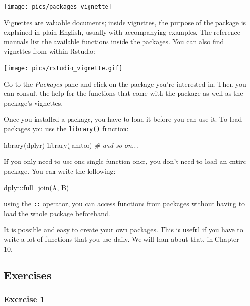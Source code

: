 \documentclass[
]{article}
\newenvironment{Shaded}{\begin{snugshade}}{\end{snugshade}}
\newcommand{\CommentTok}[1]{\textcolor[rgb]{0.56,0.35,0.01}{\textit{#1}}}
\newcommand{\FunctionTok}[1]{\textcolor[rgb]{0.00,0.00,0.00}{#1}}
\newcommand{\NormalTok}[1]{#1}
\newcommand{\SpecialCharTok}[1]{\textcolor[rgb]{0.00,0.00,0.00}{#1}}
\begin{document}
\texttt{[image: pics/packages\_vignette]}

Vignettes are valuable documents; inside vignettes, the purpose of the package is explained in
plain English, usually with accompanying examples. The reference manuals list the available functions
inside the packages. You can also find vignettes from within Rstudio:

\texttt{[image: pics/rstudio\_vignette.gif]}

Go to the \emph{Packages} pane and click on the package you're interested in. Then you can consult the
help for the functions that come with the package as well as the package's vignettes.

Once you installed a package, you have to load it before you can use it. To load packages you use the
\texttt{library()} function:

\begin{Shaded}
\begin{Highlighting}[]
\FunctionTok{library}\NormalTok{(dplyr)}
\FunctionTok{library}\NormalTok{(janitor)}
\CommentTok{\# and so on...}
\end{Highlighting}
\end{Shaded}

If you only need to use one single function once, you don't need to load an entire package. You can
write the following:

\begin{Shaded}
\begin{Highlighting}[]
\NormalTok{dplyr}\SpecialCharTok{::}\FunctionTok{full\_join}\NormalTok{(A, B)}
\end{Highlighting}
\end{Shaded}

using the \texttt{::} operator, you can access functions from packages without having to load the whole
package beforehand.

It is possible and easy to create your own packages. This is useful if you have to write a lot of
functions that you use daily. We will lean about that, in Chapter 10.

\hypertarget{exercises}{%
\subsection{Exercises}\label{exercises}}

\hypertarget{exercise-1}{%
\subsubsection*{Exercise 1}\label{exercise-1}}
\end{document}
